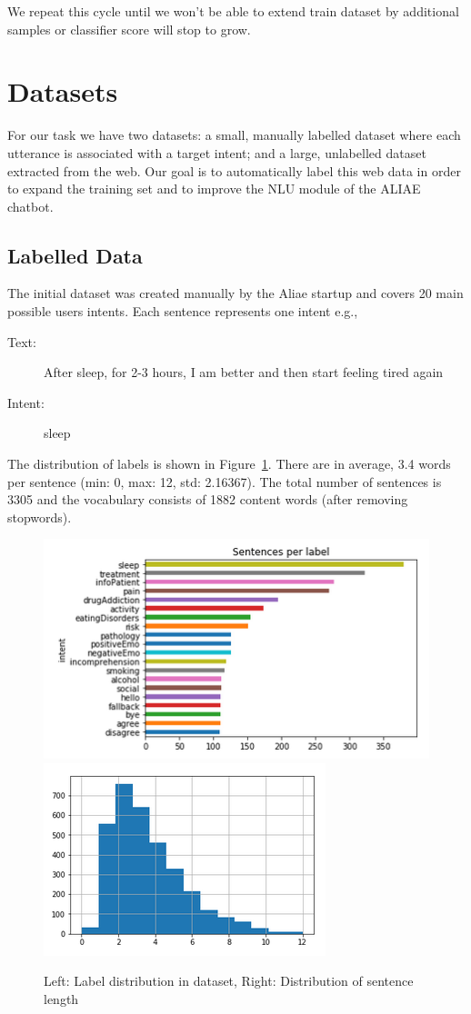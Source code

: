 \documentclass[11pt]{article}
\begin{document}
We repeat this cycle until we won't be able to extend train dataset by additional samples or classifier score will stop to grow.

\section{Datasets}
\label{sec:datasets}

For our task we have two datasets: a small, manually labelled dataset
where each utterance is associated with a target intent; and a large,
unlabelled dataset extracted from the web. Our goal is to
automatically label this web data in order to expand the training set
and to improve the NLU module of the ALIAE chatbot.


\subsection{Labelled Data}
\label{subsec:labelleddata}
The initial dataset was created manually by the Aliae startup and  covers 20 main possible users intents. Each sentence represents one intent e.g., 
\begin{description}
\item[Text:] After sleep, for 2-3 hours, I am better and then start feeling tired again
\item[Intent:] sleep
\end{description}

The distribution of labels is shown in Figure~\ref{figure:name}. There
are in average, 3.4 words per sentence (min: 0, max: 12, std:
2.16367).  The total number of sentences is 3305 and the vocabulary
consists of 1882 content words (after removing stopwords).

 \begin{figure}[h]
 	\centering
 	\includegraphics[scale=0.4]{report1.png}
	\includegraphics[scale=0.45]{report4.png}	
	\caption{Left: Label distribution in dataset, Right: Distribution of sentence length}
 \label{figure:name}
 \end{figure}
\FloatBarrier
\end{document}

